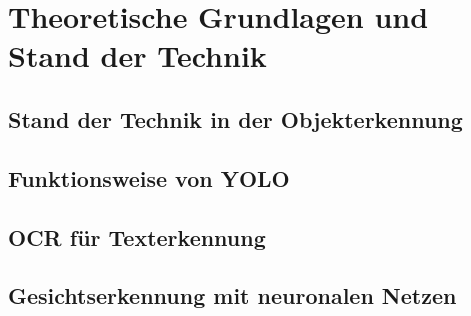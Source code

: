 \section{Theoretische Grundlagen und Stand der Technik}
\subsection{Stand der Technik in der Objekterkennung}
\subsection{Funktionsweise von YOLO}
\subsection{OCR für Texterkennung}
\subsection{Gesichtserkennung mit neuronalen Netzen}